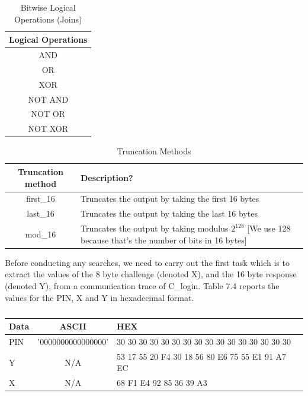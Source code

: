 \documentclass[bsc,frontabs,twoside,singlespacing,parskip,deptreport]{infthesis}     %
\begin{document}
\begin{table}[H]
\begin{center}
\begin{tabular}{|c|}
\hline
Logical Operations\\
\hline
AND\\
OR \\
XOR\\
NOT AND\\
NOT OR\\
NOT XOR\\
\hline
\end{tabular}
\end{center}
\caption{Bitwise Logical Operations (Joins)}
\end{table}

\begin{table}[H]
\begin{center}
\begin{tabular}{|c|p{10cm}|}
\hline
Truncation method & Description?\\
\hline
first\_16 & Truncates the output by taking the first 16 bytes \\
last\_16 & Truncates the output by taking the last 16 bytes\\
mod\_16 & Truncates the output by taking modulus $2^{128}$ [We use 128 because that's the number of bits in 16 bytes]  \\
\hline
\end{tabular}
\end{center}
\caption{Truncation Methods}
\end{table}

Before conducting any searches, we need to carry out the first task which is to extract the values of the 8 byte challenge (denoted X), and the 16 byte response (denoted Y), from a communication trace of C\_login. Table 7.4 reports the values for the PIN, X and Y in hexadecimal format.\\

 
\begin{table}[H]
\begin{center}  
\begin{tabular}{|l|c|l|}
\hline
Data & ASCII & HEX\\
\hline
PIN & '0000000000000000' & 30 30 30 30 30 30 30 30 30 30 30 30 30 30 30 30\\
\hline
Y & N/A & 53 17 55 20 F4 30 18 56 80 E6 75 55 E1 91 A7 EC\\
\hline
X & N/A & 68 F1 E4 92 85 36 39 A3\\
\hline
\end{tabular}
\end{center}
\caption{}
\end{table}
\end{document}
